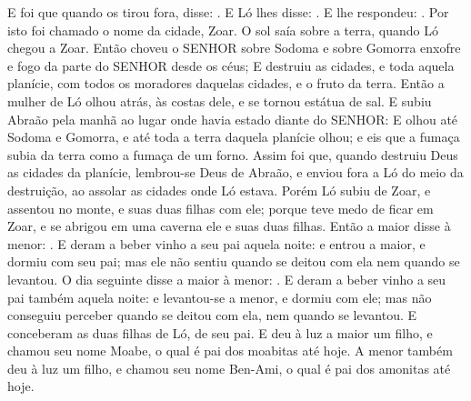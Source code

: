 {  E foi que quando os tirou fora, disse: . %
  E Ló lhes disse: .
  E lhe respondeu: . Por isto foi chamado o nome da cidade, Zoar.
  O sol saía sobre a terra, quando Ló chegou a Zoar.
  Então choveu o SENHOR sobre Sodoma e sobre Gomorra enxofre e fogo da parte do SENHOR desde os céus;
  E destruiu as cidades, e toda aquela planície, com todos os moradores daquelas cidades, e o fruto da terra.
  Então a mulher de Ló olhou atrás, às costas dele, e se tornou estátua de sal. %
  E subiu Abraão pela manhã ao lugar onde havia estado diante do SENHOR:
  E olhou até Sodoma e Gomorra, e até toda a terra daquela planície olhou; e eis que a fumaça subia da terra como a fumaça de um forno.
  Assim foi que, quando destruiu Deus as cidades da planície, lembrou-se Deus de Abraão, e enviou fora a Ló do meio da destruição, ao assolar as cidades onde Ló estava.
  Porém Ló subiu de Zoar, e assentou no monte, e suas duas filhas com ele; porque teve medo de ficar em Zoar, e se abrigou em uma caverna ele e suas duas filhas.
  Então a maior disse à menor: .
  E deram a beber vinho a seu pai aquela noite: e entrou a maior, e dormiu com seu pai; mas ele não sentiu quando se deitou com ela nem quando se levantou.
  O dia seguinte disse a maior à menor: .
  E deram a beber vinho a seu pai também aquela noite: e levantou-se a menor, e dormiu com ele; mas não conseguiu perceber quando se deitou com ela, nem quando se levantou.
  E conceberam as duas filhas de Ló, de seu pai.
  E deu à luz a maior um filho, e chamou seu nome Moabe, o qual é pai dos moabitas até hoje.
  A menor também deu à luz um filho, e chamou seu nome Ben-Ami, o qual é pai dos amonitas até hoje.
\par }

